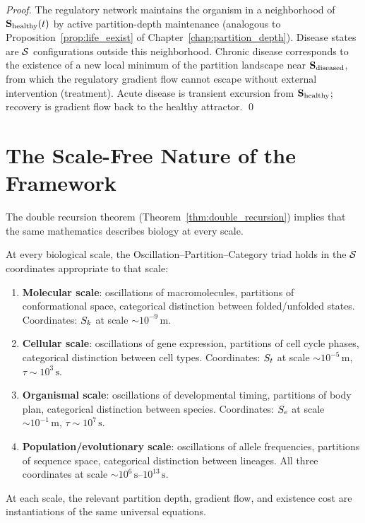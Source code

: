 \begin{proof}
The regulatory network maintains the organism in a neighborhood of
$\mathbf{S}_{\mathrm{healthy}}(t)$ by active partition-depth maintenance
(analogous to Proposition~\ref{prop:life_eexist} of Chapter~\ref{chap:partition_depth}).
Disease states are $\mathcal{S}$ configurations outside this neighborhood.
Chronic disease corresponds to the existence of a new local minimum of the
partition landscape near $\mathbf{S}_{\mathrm{diseased}}$, from which the
regulatory gradient flow cannot escape without external intervention (treatment).
Acute disease is transient excursion from $\mathbf{S}_{\mathrm{healthy}}$;
recovery is gradient flow back to the healthy attractor. \qed
\end{proof}

\section{The Scale-Free Nature of the Framework}
\label{sec:scale_free}

The double recursion theorem (Theorem~\ref{thm:double_recursion}) implies that
the same mathematics describes biology at every scale.

\begin{theorem}
\label{thm:scale_invariance}
At every biological scale, the Oscillation--Partition--Category triad holds
in the $\mathcal{S}$ coordinates appropriate to that scale:
\begin{enumerate}[label=(\roman*)]
  \item \textbf{Molecular scale}: oscillations of macromolecules, partitions of
        conformational space, categorical distinction between folded/unfolded
        states. Coordinates: $S_k$ at scale $\sim 10^{-9}\,\mathrm{m}$.
  \item \textbf{Cellular scale}: oscillations of gene expression, partitions of
        cell cycle phases, categorical distinction between cell types.
        Coordinates: $S_t$ at scale $\sim 10^{-5}\,\mathrm{m}$, $\tau \sim 10^3\,\mathrm{s}$.
  \item \textbf{Organismal scale}: oscillations of developmental timing,
        partitions of body plan, categorical distinction between species.
        Coordinates: $S_e$ at scale $\sim 10^{-1}\,\mathrm{m}$, $\tau \sim 10^7\,\mathrm{s}$.
  \item \textbf{Population/evolutionary scale}: oscillations of allele frequencies,
        partitions of sequence space, categorical distinction between lineages.
        All three coordinates at scale $\sim 10^6\,\mathrm{s}$--$10^{13}\,\mathrm{s}$.
\end{enumerate}
At each scale, the relevant partition depth, gradient flow, and existence cost
are instantiations of the same universal equations.
\end{theorem}

